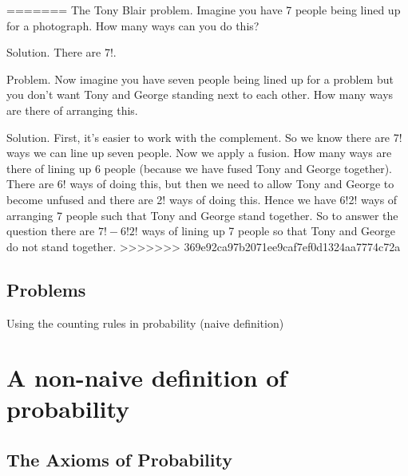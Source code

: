 \documentclass[12pt]{extbook}
\begin{document}
=======
The Tony Blair problem.   Imagine you have 7 people being lined up for a photograph.   How many ways can you do this?

Solution.  There are 7!.

Problem.   Now imagine you have seven people being lined up for a problem but you don't want Tony and George standing next to each other.   How many ways are there of arranging this.

Solution.   First, it's easier to work with the complement.   So we know there are 7! ways we can line up seven people.   Now we apply a fusion.   How many ways are there of lining up 6 people (because we have fused Tony and George together).   There are 6! ways of doing this, but then we need to allow Tony and George to become unfused and there are 2! ways of doing this.   Hence we have 6!2! ways of arranging 7 people such that Tony and George stand together.   So to answer the question there are $7!-6!2!$ ways of lining up 7 people so that Tony and George do not stand together.
>>>>>>> 369e92ca97b2071ee9caf7ef0d1324aa7774c72a



\section{Problems}

\begin{enumerate}







\end{enumerate}


Using the counting rules in probability (naive definition)

\begin{enumerate}

\end{enumerate}

\chapter{A non-naive definition of probability}


\section{The Axioms of Probability}
\end{document}
